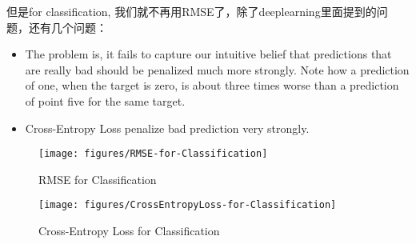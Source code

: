 但是for classification, 我们就不再用RMSE了，除了deeplearning里面提到的问题，还有几个问题：
\begin{itemize}
	\item The problem is, it fails to capture our intuitive belief that	predictions that are really bad should be penalized much more strongly. Note how a prediction of one, when the target is zero, is about three times worse than a prediction of point five for the same target.
	\item Cross-Entropy Loss penalize bad prediction very strongly.
\end{itemize}
\begin{figure}[H]
	\centering
	\texttt{[image: figures/RMSE-for-Classification]}
	\caption{RMSE for Classification}
\end{figure}
\begin{figure}[H]
	\centering
	\texttt{[image: figures/CrossEntropyLoss-for-Classification]}
	\caption{Cross-Entropy Loss for Classification}
\end{figure}



